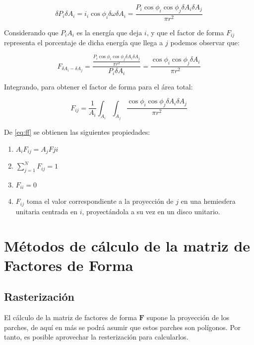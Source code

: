 \begin{equation}
    \delta{P}_{i}\delta{A_{i}} = i_{i} \cos{\phi_{i}}\delta{\omega}\delta{A_{i}} = \frac{P_{i}\cos{\phi_{i}}\cos{\phi_{j}}\delta{A_{i}}\delta{A_{j}}}{\pi r^{2}}
\end{equation}

Considerando que ${P}_{i}{A_{i}}$ es la energía que deja $i$, y que el factor de forma $F_{ij}$ representa el porcentaje
de dicha energía que llega a $j$ podemos observar que:

\begin{equation}
    F_{\delta{A_{i}}-\delta{A_{j}}} = \frac{\frac{P_{i}\cos{\phi_{i}}\cos{\phi_{j}}\delta{A_{i}}\delta{A_{j}}}{\pi r^{2}}}{P_{i}\delta{A_{i}}} = \frac{\cos{\phi_{i}}\cos{\phi_{j}}\delta{A_{i}}}{\pi{r^{2}}}
\end{equation}

Integrando, para obtener el factor de forma para el área total:

\begin{equation}
    F_{ij} = \frac{1}{A_{i}} \int_{A_{i}}\int_{A_{j}}\frac{\cos{\phi_{i}}\cos{\phi_{j}}\delta{A_{i}}\delta{A_{j}}}{\pi{r^{2}}} \label{eq:ff}    
\end{equation}

De \eqref{eq:ff} se obtienen las siguientes propiedades:
\begin{enumerate}
	\label{propsff}
    \item $A_{i}F_{ij} = A_{j}F{ji}$
    \item $\sum_{j=1}^{N} F_{ij} = 1$
    \item $F_{ii} = 0$
    \item $F_{ij}$ toma el valor correspondiente a la proyección de $j$ en una hemiesfera unitaria centrada en $i$, proyectándola a su vez en un disco unitario.
\end{enumerate}

\section{Métodos de cálculo de la matriz de Factores de Forma}
\label{sec:calculoff}

\subsection{Rasterización}

El cálculo de la matriz de factores de forma $\mathbf{F}$ supone la proyección de los parches, de aquí en más se podrá asumir que estos parches son polígonos. Por tanto, es posible aprovechar la resterización para calcularlos.

